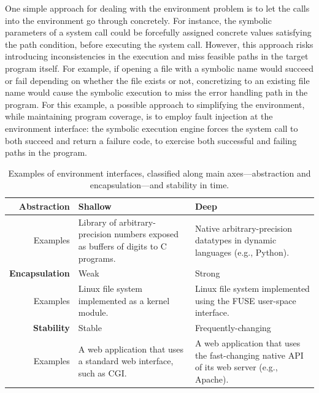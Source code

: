 One simple approach for dealing with the environment problem is to let the calls into the environment go through concretely.
%
For instance, the symbolic parameters of a system call could be forcefully assigned concrete values satisfying the path condition, before executing the system call.  However, this approach risks introducing inconsistencies in the execution and miss feasible paths in the target program itself.
%
For example, if opening a file with a symbolic name would succeed or fail depending on whether the file exists or not, concretizing to an existing file name would cause the symbolic execution to miss the error handling path in the program.
%
For this example, a possible approach to simplifying the environment, while maintaining program coverage, is to employ fault injection at the environment interface: the symbolic execution engine forces the system call to both succeed and return a failure code, to exercise both successful and failing paths in the program.

\newcommand{\cnineccolor}{\cellcolor{GreenYellow}}
\newcommand{\chefccolor}{\cellcolor{SkyBlue}}

\begin{table}
  \centering
  \small
  \begin{tabular}{r p{6cm} p{6cm}}
    
    \textbf{Abstraction} & Shallow & Deep \\
    \hline
    \bigskip Examples      & Library of arbitrary-precision numbers exposed as buffers of digits to C programs.     & Native arbitrary-precision datatypes in dynamic languages (e.g., Python). \\
    
    \textbf{Encapsulation} & Weak & Strong \\
    \hline
    \bigskip Examples      & Linux file system implemented as a kernel module.   & Linux file system implemented using the FUSE user-space interface. \\
    
    \textbf{Stability}   & Stable    & Frequently-changing \\
    \hline
        Examples          & A web application that uses a standard web interface, such as CGI.    & A web application that uses the fast-changing native API of its web server (e.g., Apache). \\
  \end{tabular}
  \caption{Examples of environment interfaces, classified along main axes---abstraction and encapsulation---and stability in time.
}
  \label{tab:intro:env}
\end{table}

